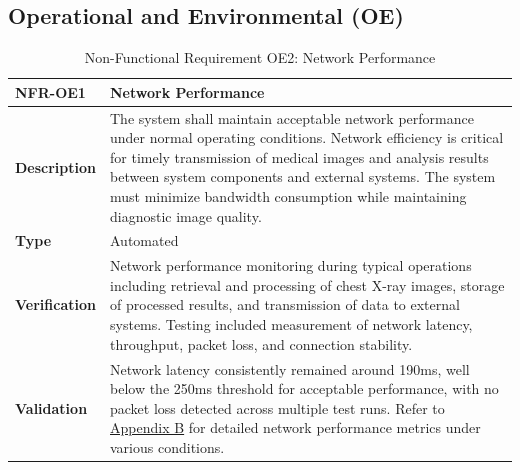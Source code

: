 \documentclass[12pt, titlepage]{article}
\begin{document}
\subsection{Operational and Environmental (OE)}
\begin{table}[H]
\centering
{}
\begin{tabular}{|p{3.5cm}|p{11.5cm}|}
\hline
\rowcolor{gray!30}
\textbf{NFR-OE1} & \textbf{Network Performance} \\
\hline
\textbf{Description} & The system shall maintain acceptable network performance under normal operating conditions. Network efficiency is critical for timely transmission of medical images and analysis results between system components and external systems. The system must minimize bandwidth consumption while maintaining diagnostic image quality. \\
\hline
\textbf{Type} & Automated \\
\hline
\textbf{Verification} & Network performance monitoring during typical operations including retrieval and processing of chest X-ray images, storage of processed results, and transmission of data to external systems. Testing included measurement of network latency, throughput, packet loss, and connection stability. \\
\hline
\textbf{Validation} & Network latency consistently remained around 190ms, well below the 250ms threshold for acceptable performance, with no packet loss detected across multiple test runs. Refer to \hyperref[appendix:B]{Appendix B} for detailed network performance metrics under various conditions. \\
\hline
\end{tabular}
\caption{Non-Functional Requirement OE2: Network Performance}
\end{table}
\end{document}
